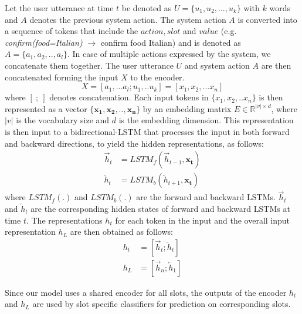 \documentclass{article}
\begin{document}
Let the user utterance at time $t$ be denoted as $U=\{u_1,u_2,...,u_k\}$ with $k$ words and $A$ denotes the previous system action.
The system action $A$ is converted into a sequence of tokens that include the $action, slot$ and $value$ (e.g. \textit{confirm(food=Italian)} $\rightarrow$ confirm food Italian) and is denoted as $A=\{a_1, a_2,..,a_l\}$.
In case of multiple actions expressed by the system, we concatenate them together.
The user utterance $U$ and system action $A$ are then concatenated forming the input $X$ to the encoder.
\[X = [a_1,...a_l;u_1,..u_k] = [x_1,x_2,...x_n]\]
where $[\:;\:]$ denotes concatenation.
Each input tokens in $\{x_1,x_2,..x_n\}$ is then represented as a vector 
$\{\boldsymbol{x_1},\boldsymbol{x_2},..,\boldsymbol{x_n}\}$ 
by an embedding matrix $E \in \mathbb{R}^{|v|\times d}$,
where $|v|$ is the vocabulary size and $d$ is the embedding dimension.
This representation is then input to a bidirectional-LSTM \cite{hochreiter1997long} that processes the input in both forward and backward directions, to yield the hidden representations, as follows:
\begin{align}
    \overrightarrow{h}_t &= LSTM_f(\overrightarrow{h}_{t-1}, \boldsymbol{x_t}) \\
    \overleftarrow{h}_t &= LSTM_b(\overleftarrow{h}_{t+1}, \boldsymbol{x_t})
\end{align}
where $LSTM_f(.)$ and $LSTM_b(.)$ are the forward and backward LSTMs. $\overrightarrow{h}_t$ and $\overleftarrow{h}_t$ are the corresponding hidden states of forward and backward LSTMs at time $t$.
The representations $h_t$ for each token in the input and the overall input representation $h_L$ are then obtained as follows:
\begin{align}
    h_t &= [\overrightarrow{h}_t;\overleftarrow{h}_t] \\
    h_L & = [\overrightarrow{h}_n;\overleftarrow{h}_1]
\end{align}

Since our model uses a shared encoder for all slots, the outputs of the encoder $h_t$ and $h_L$ are used by slot specific classifiers for prediction on corresponding slots.
\end{document}
